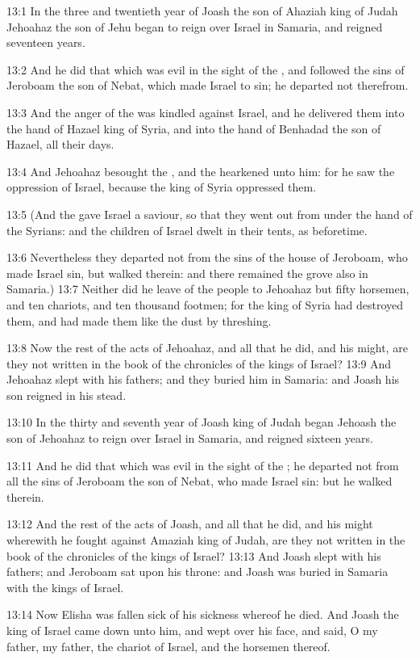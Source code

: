 13:1 In the three and twentieth year of Joash the son of Ahaziah king of Judah Jehoahaz the son of Jehu began to reign over Israel in Samaria, and reigned seventeen years.

13:2 And he did that which was evil in the sight of the \LORD, and followed the sins of Jeroboam the son of Nebat, which made Israel to sin; he departed not therefrom.

13:3 And the anger of the \LORD was kindled against Israel, and he delivered them into the hand of Hazael king of Syria, and into the hand of Benhadad the son of Hazael, all their days.

13:4 And Jehoahaz besought the \LORD, and the \LORD hearkened unto him: for he saw the oppression of Israel, because the king of Syria oppressed them.

13:5 (And the \LORD gave Israel a saviour, so that they went out from under the hand of the Syrians: and the children of Israel dwelt in their tents, as beforetime.

13:6 Nevertheless they departed not from the sins of the house of Jeroboam, who made Israel sin, but walked therein: and there remained the grove also in Samaria.)  13:7 Neither did he leave of the people to Jehoahaz but fifty horsemen, and ten chariots, and ten thousand footmen; for the king of Syria had destroyed them, and had made them like the dust by threshing.

13:8 Now the rest of the acts of Jehoahaz, and all that he did, and his might, are they not written in the book of the chronicles of the kings of Israel?  13:9 And Jehoahaz slept with his fathers; and they buried him in Samaria: and Joash his son reigned in his stead.

13:10 In the thirty and seventh year of Joash king of Judah began Jehoash the son of Jehoahaz to reign over Israel in Samaria, and reigned sixteen years.

13:11 And he did that which was evil in the sight of the \LORD; he departed not from all the sins of Jeroboam the son of Nebat, who made Israel sin: but he walked therein.

13:12 And the rest of the acts of Joash, and all that he did, and his might wherewith he fought against Amaziah king of Judah, are they not written in the book of the chronicles of the kings of Israel?  13:13 And Joash slept with his fathers; and Jeroboam sat upon his throne: and Joash was buried in Samaria with the kings of Israel.

13:14 Now Elisha was fallen sick of his sickness whereof he died. And Joash the king of Israel came down unto him, and wept over his face, and said, O my father, my father, the chariot of Israel, and the horsemen thereof.

